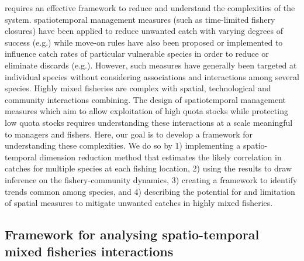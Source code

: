 \documentclass[fleqn,10pt]{wlscirep}
\begin{document}
\begin{linenumbers}
 requires an
effective framework to reduce and understand the complexities of the system.
 spatiotemporal management measures (such as
time-limited fishery closures) have been applied to reduce unwanted catch with
varying degrees of success (e.g.\cite{Needle2011, Holmes2011, Beare2010,
	Dinmore2003}) while move-on rules have also been proposed or
implemented to influence catch rates of particular vulnerable species in order
to reduce or eliminate discards (e.g.\cite{Gardner2008, Dunn2011, Dunn2014a}).
However, such measures have generally been targeted at individual species
without considering associations and interactions among several species. Highly
mixed fisheries are complex with spatial, technological and community
interactions combining. The design of spatiotemporal management measures which
aim to allow exploitation of high quota stocks while protecting low quota
stocks requires understanding these interactions at a scale meaningful to
managers and fishers. Here, our goal is to develop a framework for
understanding these complexities. We do so by 1) implementing a spatio-temporal
dimension reduction method that estimates the likely correlation in catches for
multiple species at each fishing location, 2) using the results to draw
inference on the fishery-community dynamics, 3) creating a framework to
identify trends common among species, and 4) describing the potential for and
limitation of spatial measures to mitigate unwanted catches in highly mixed
fisheries.\\

\subsection*{Framework for analysing spatio-temporal mixed fisheries
	interactions \\}


\end{linenumbers}
\end{document}
